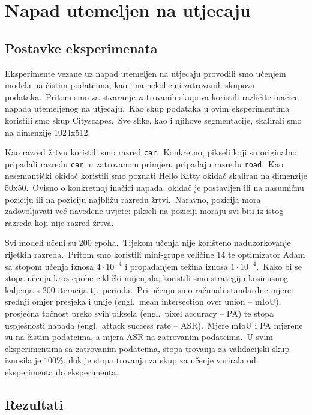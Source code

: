 \documentclass[times, utf8, seminar, numeric]{fer}
\begin{document}
\section{Napad utemeljen na utjecaju}

\subsection{Postavke eksperimenata}

Eksperimente vezane uz napad utemeljen na utjecaju provodili smo učenjem modela na čistim podatcima, kao i na nekolicini zatrovanih skupova podataka.\ 
Pritom smo za stvaranje zatrovanih skupova koristili različite inačice napada utemeljenog na utjecaju.\ Kao skup podataka u ovim eksperimentima koristili smo skup Cityscapes.\ 
Sve slike, kao i njihove segmentacije, skalirali smo na dimenzije 1024x512.\ 
  
Kao razred žrtvu koristili smo razred \texttt{car}.\ Konkretno, pikseli koji su originalno pripadali razredu \texttt{car}, u zatrovanom primjeru pripadaju razredu \texttt{road}.\ 
Kao nesemantički okidač koristili smo poznati Hello Kitty okidač skaliran na dimenzije 50x50.\ 
Ovisno o konkretnoj inačici napada, okidač je postavljen ili na nasumičnu poziciju ili na poziciju najbližu razredu žrtvi.\ 
Naravno, pozicija mora zadovoljavati već navedene uvjete: pikseli na poziciji moraju svi biti iz istog razreda koji nije razred žrtva.\ 
  
Svi modeli učeni su 200 epoha.\ Tijekom učenja nije korišteno naduzorkovanje rijetkih razreda.\ Pritom smo koristili mini-grupe veličine 14 te optimizator Adam sa stopom učenja iznosa $4 \cdot 10^{-4}$ i propadanjem težina iznosa $1 \cdot 10^{-4}$.\
Kako bi se stopa učenja kroz epohe ciklički mijenjala, koristili smo strategiju kosinusnog kaljenja s 200 iteracija tj.\ perioda.\ 
Pri učenju smo računali standardne mjere: srednji omjer presjeka i unije (engl.\ mean intersection over union – mIoU), prosječna točnost preko svih piksela (engl.\ pixel accuracy – PA) te stopa uspješnosti napada (engl.\ attack success rate – ASR).\ 
Mjere mIoU i PA mjerene su na čistim podatcima, a mjera ASR na zatrovanim podatcima.\
U svim eksperimentima sa zatrovanim podatcima, stopa trovanja za validacijski skup iznosila je $100\%$, dok je stopa trovanja za skup za učenje varirala od eksperimenta do eksperimenta.\ 

\subsection{Rezultati}
\end{document}
